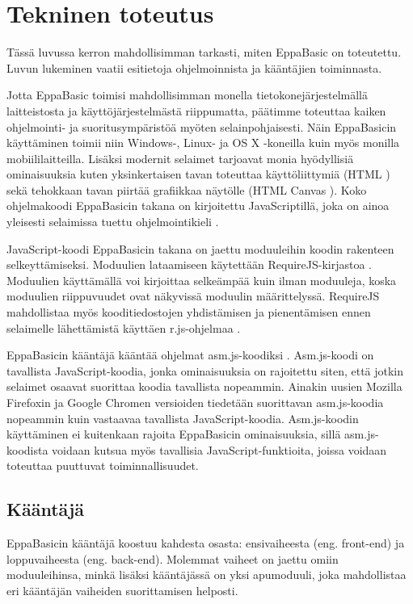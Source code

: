 
\section{Tekninen toteutus}
Tässä luvussa kerron mahdollisimman tarkasti,
miten EppaBasic on toteutettu.
Luvun lukeminen vaatii esitietoja
ohjelmoinnista ja kääntäjien toiminnasta.

Jotta EppaBasic toimisi mahdollisimman monella
tietokonejärjestelmällä laitteistosta ja
käyttöjärjestelmästä riippumatta,
päätimme toteuttaa kaiken ohjelmointi-
ja suoritusympäristöä myöten
selainpohjaisesti.
Näin EppaBasicin käyttäminen toimii niin
Windows-, Linux- ja OS X -koneilla
kuin myös monilla mobiililaitteilla.
Lisäksi modernit selaimet tarjoavat
monia hyödyllisiä ominaisuuksia
kuten yksinkertaisen tavan toteuttaa
käyttöliittymiä (HTML \cite{w3c_html})
sekä tehokkaan tavan piirtää grafiikkaa
näytölle (HTML Canvas \cite{mdn_canvas}).
Koko ohjelmakoodi EppaBasicin takana
on kirjoitettu JavaScriptillä,
joka on ainoa yleisesti selaimissa
tuettu ohjelmointikieli \cite{mdn_about_js}.

JavaScript-koodi EppaBasicin takana
on jaettu moduuleihin koodin
rakenteen selkeyttämiseksi.
Moduulien lataamiseen käytettään
RequireJS-kirjastoa \cite{requirejs}.
Moduulien käyttämällä voi kirjoittaa
selkeämpää kuin ilman moduuleja,
koska moduulien riippuvuudet ovat
näkyvissä moduulin määrittelyssä.
RequireJS mahdollistaa myös kooditiedostojen
yhdistämisen ja pienentämisen ennen selaimelle
lähettämistä käyttäen r.js-ohjelmaa \cite{r.js}.

EppaBasicin kääntäjä kääntää ohjelmat
asm.js-koodiksi \cite{asm.js}.
Asm.js-koodi on tavallista
JavaScript-koodia, jonka
ominaisuuksia on rajoitettu siten,
että jotkin selaimet osaavat
suorittaa koodia tavallista
nopeammin.
Ainakin uusien Mozilla Firefoxin
ja Google Chromen versioiden
tiedetään suorittavan
asm.js-koodia nopeammin
kuin vastaavaa tavallista
JavaScript-koodia.
Asm.js-koodin käyttäminen
ei kuitenkaan rajoita
EppaBasicin ominaisuuksia,
sillä asm.js-koodista
voidaan kutsua myös
tavallisia JavaScript-funktioita,
joissa voidaan toteuttaa
puuttuvat toiminnallisuudet.


\subsection{Kääntäjä}
EppaBasicin kääntäjä koostuu kahdesta osasta:
ensivaiheesta (eng. front-end) ja
loppuvaiheesta (eng. back-end).
Molemmat vaiheet on jaettu omiin moduuleihinsa,
minkä lisäksi kääntäjässä on yksi apumoduuli,
joka mahdollistaa eri kääntäjän vaiheiden
suorittamisen helposti.

